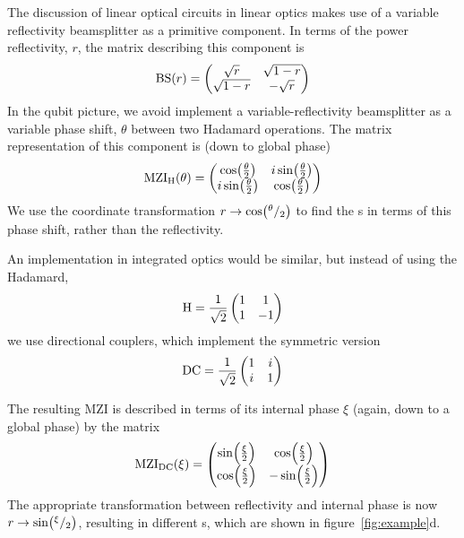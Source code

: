 The discussion of linear optical circuits in linear optics makes use of a
variable reflectivity beamsplitter as a primitive component. In terms of the
power reflectivity, \(r\), the matrix describing this component is
\begin{equation}
  \mathrm{BS} \!\left(r\right) = \begin{pmatrix}
    \sqrt{r} & \sqrt{1-r} \\
    \sqrt{1-r} & -\sqrt{r}
  \end{pmatrix}
\end{equation}
In the qubit picture, we avoid implement a variable-reflectivity beamsplitter as
a variable phase shift, \(\theta\) between two Hadamard operations. The matrix
representation of this component is (down to global phase)
\begin{equation}
  \mathrm{MZI}_{\mathrm{H}} \!\left(\theta\right) = \begin{pmatrix}
    \cos \!\left( \frac{\theta}{2} \right) & i \sin \!\left( \frac{\theta}{2} \right) \\
    i \sin \!\left( \frac{\theta}{2} \right) & \cos \!\left( \frac{\theta}{2} \right)
  \end{pmatrix}
\end{equation}
We use the coordinate transformation \( r \rightarrow \cos \!\left( ^{\theta}/_{2}\right)
\) to find the \pdf{}s in terms of this phase shift, rather than the
reflectivity.

An implementation in integrated optics would be similar, but instead of using
the Hadamard,
\begin{equation}
  \mathrm{H} = \frac{1}{\sqrt{2}} \begin{pmatrix}
    1 & 1 \\
    1 & -1
  \end{pmatrix}
\end{equation}
we use directional couplers, which implement the symmetric version
\begin{equation}
  \mathrm{DC} = \frac{1}{\sqrt{2}} \begin{pmatrix}
    1 & i \\
    i & 1
  \end{pmatrix}
\end{equation}

The resulting MZI is described in terms of its internal phase \(\xi\) (again,
down to a global phase) by the matrix
\begin{equation}
  \mathrm{MZI}_{\mathrm{DC}} \!\left(\xi\right) = \begin{pmatrix}
    \sin \!\left( \frac{\xi}{2} \right) & \cos \!\left( \frac{\xi}{2} \right) \\
    \cos \!\left( \frac{\xi}{2} \right) & -\sin \!\left( \frac{\xi}{2} \right)
  \end{pmatrix}
\end{equation}
The appropriate transformation between reflectivity and internal phase is now
\(r \rightarrow \sin \!\left(^{\xi}/_{2}\right) \), resulting in different \pdf{}s, which
are shown in figure~\ref{fig:example}d.

